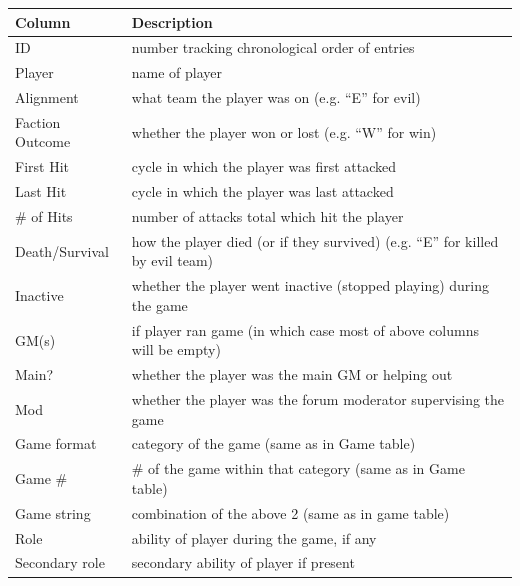 \documentclass[11pt, oneside]{amsart}   	%
\begin{document}
\begin{table}[h]
    \begin{tabular}{ll}
    \textbf{Column}       & \textbf{Description} \\                                                          
    \hline
    ID              & number tracking chronological order of entries                         \\
    Player          & name of player                                                         \\
    Alignment       & what team the player was on (e.g. ``E'' for evil)                     \\
    Faction Outcome & whether the player won or lost (e.g. ``W'' for win)                  \\
    First Hit       & cycle in which the player was first attacked                           \\
    Last Hit        & cycle in which the player was last attacked                            \\
    \# of Hits      & number of attacks total which hit the player                           \\
    Death/Survival  & how the player died (or if they survived) (e.g. ``E'' for killed by evil team)   \\
    Inactive        & whether the player went inactive (stopped playing) during the game     \\
    GM(s)           & if player ran game (in which case most of above columns will be empty) \\
    Main?           & whether the player was the main GM or helping out                      \\
    Mod             & whether the player was the forum moderator supervising the game        \\
    Game format     & category of the game (same as in Game table)                           \\
    Game \#         & \# of the game within that category (same as in Game table)            \\
    Game string     & combination of the above 2 (same as in game table)                     \\
    Role            & ability of player during the game, if any                              \\
    Secondary role  & secondary ability of player if present                                           
    \end{tabular}
\end{table}
\end{document}
